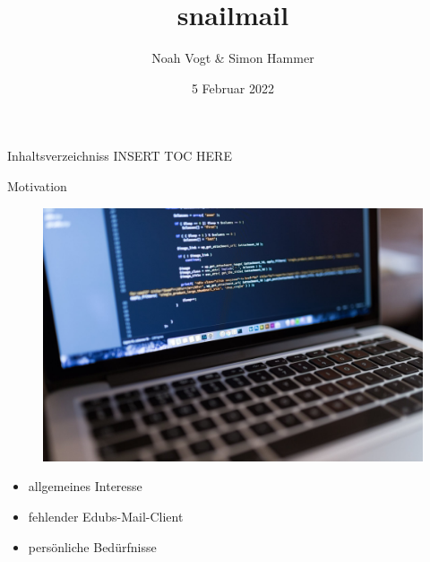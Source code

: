 \documentclass[aspectratio=169]{beamer}
\title{snailmail}
\author{Noah Vogt \& Simon Hammer}
\date{5 Februar 2022}
\institute{Gymnasium Kirschgarten}
\newlength\myheight
\newlength\mydepth
\newcommand*\inlinegraphics[1]{
    \settototalheight\myheight{Xygp}
    \settodepth\mydepth{Xygp}
    \raisebox{-\mydepth}{\texttt{[image: \#1]}}%
}
\begin{document}
\maketitle

\begin{frame}{Inhaltsverzeichniss}
INSERT TOC HERE
\end{frame}

\begin{frame}{Motivation}
\begin{varwidth}{.5\textwidth}
        \begin{figure}
            \centering
            \includegraphics[width=.9\textwidth]{media/macbook.jpg}
        \end{figure}
    \end{varwidth}
    \hfill
    \begin{varwidth}{.5\textwidth}
        \begin{itemize}\pause
            \item allgemeines Interesse\pause
            \item fehlender Edubs-Mail-Client\pause
            \item persönliche Bedürfnisse
        \end{itemize}
    \end{varwidth} 
\end{frame}
\end{document}
